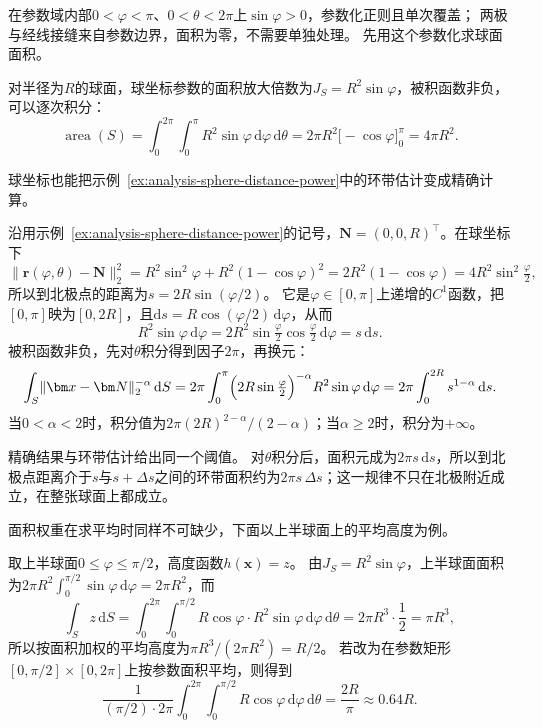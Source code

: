 在参数域内部$0<\varphi<\pi$、$0<\theta<2\pi$上$\sin\varphi>0$，参数化正则且单次覆盖；
两极与经线接缝来自参数边界，面积为零，不需要单独处理。
先用这个参数化求球面面积。

\begin{example}[球面的面积]
\label{ex:analysis-sphere-area}
对半径为$R$的球面，球坐标参数的面积放大倍数为$J_S=R^2\sin\varphi$，被积函数非负，可以逐次积分：
\[
 \operatorname{area}(S)
 =\int_0^{2\pi}\int_0^\pi R^2\sin\varphi\,\mathrm d\varphi\,\mathrm d\theta
 =2\pi R^2\bigl[-\cos\varphi\bigr]_0^\pi
 =4\pi R^2.
\]
\end{example}

球坐标也能把示例~\ref{ex:analysis-sphere-distance-power}中的环带估计变成精确计算。

\begin{example}[球面上距离负幂积分的精确值]
\label{ex:analysis-sphere-distance-power-exact}
沿用示例~\ref{ex:analysis-sphere-distance-power}的记号，$\bm N=(0,0,R)^\top$。在球坐标下
\[
 \lVert\bm r(\varphi,\theta)-\bm N\rVert_2^2
 =R^2\sin^2\varphi+R^2(1-\cos\varphi)^2
 =2R^2(1-\cos\varphi)
 =4R^2\sin^2\tfrac\varphi2,
\]
所以到北极点的距离为$s=2R\sin(\varphi/2)$。
它是$\varphi\in[0,\pi]$上递增的$C^1$函数，把$[0,\pi]$映为$[0,2R]$，且$\mathrm ds=R\cos(\varphi/2)\,\mathrm d\varphi$，从而
\[
 R^2\sin\varphi\,\mathrm d\varphi
 =2R^2\sin\tfrac\varphi2\cos\tfrac\varphi2\,\mathrm d\varphi
 =s\,\mathrm ds.
\]
被积函数非负，先对$\theta$积分得到因子$2\pi$，再换元：
\[
 \int_S\lVert\bm x-\bm N\rVert_2^{-\alpha}\,\mathrm dS
 =2\pi\int_0^\pi\Bigl(2R\sin\tfrac\varphi2\Bigr)^{-\alpha}R^2\sin\varphi\,\mathrm d\varphi
 =2\pi\int_0^{2R}s^{1-\alpha}\,\mathrm ds.
\]
当$0<\alpha<2$时，积分值为$2\pi(2R)^{2-\alpha}/(2-\alpha)$；当$\alpha\geq2$时，积分为$+\infty$。
\end{example}

精确结果与环带估计给出同一个阈值。
对$\theta$积分后，面积元成为$2\pi s\,\mathrm ds$，所以到北极点距离介于$s$与$s+\Delta s$之间的环带面积约为$2\pi s\,\Delta s$；这一规律不只在北极附近成立，在整张球面上都成立。

面积权重在求平均时同样不可缺少，下面以上半球面上的平均高度为例。

\begin{example}[上半球面的平均高度]
\label{ex:analysis-hemisphere-average-height}
取上半球面$0\leq\varphi\leq\pi/2$，高度函数$h(\bm x)=z$。
由$J_S=R^2\sin\varphi$，上半球面面积为$2\pi R^2\int_0^{\pi/2}\sin\varphi\,\mathrm d\varphi=2\pi R^2$，而
\[
 \int_Sz\,\mathrm dS
 =\int_0^{2\pi}\int_0^{\pi/2}R\cos\varphi\cdot R^2\sin\varphi\,\mathrm d\varphi\,\mathrm d\theta
 =2\pi R^3\cdot\frac12=\pi R^3,
\]
所以按面积加权的平均高度为$\pi R^3/(2\pi R^2)=R/2$。
若改为在参数矩形$[0,\pi/2]\times[0,2\pi]$上按参数面积平均，则得到
\[
 \frac1{(\pi/2)\cdot2\pi}\int_0^{2\pi}\int_0^{\pi/2}R\cos\varphi\,\mathrm d\varphi\,\mathrm d\theta
 =\frac{2R}{\pi}\approx0.64R.
\]
\end{example}

